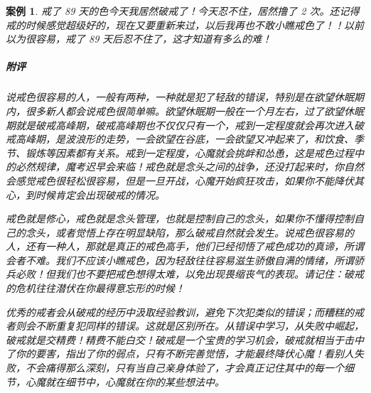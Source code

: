 \documentclass{ctexart}
\newtheorem{case}{案例}
\begin{document}
\begin{case}
    戒了 89 天的色今天我居然破戒了！今天忍不住，居然撸了 2 次。还记得戒的时候感觉超级好的，现在又要重新来过，以后我再也不敢小瞧戒色了！！以前以为很容易，戒了 89 天后忍不住了，这才知道有多么的难！
    \subparagraph{附评} 说戒色很容易的人，一般有两种，一种就是犯了轻敌的错误，特别是在欲望休眠期内，很多新人都会说戒色很简单嘛。欲望休眠期一般在一个月左右，过了欲望休眠期就是破戒高峰期，破戒高峰期也不仅仅只有一个，戒到一定程度就会再次进入破戒高峰期，是波浪形的走势，一会欲望在谷底，一会欲望又冲起来了，和饮食、季节、锻炼等因素都有关系。戒到一定程度，心魔就会挑衅和怂恿，这是戒色过程中的必然规律，魔考迟早会来临！戒色就是念头之间的战争，还没打起来时，你自然会感觉戒色很轻松很容易，但是一旦开战，心魔开始疯狂攻击，如果你不能降伏其心，到时候肯定会出现破戒的情况。

    戒色就是修心，戒色就是念头管理，也就是控制自己的念头，如果你不懂得控制自己的念头，或者觉悟上存在明显缺陷，那么破戒自然就会发生。说戒色很容易的人，还有一种人，那就是真正的戒色高手，他们已经彻悟了戒色成功的真谛，所谓会者不难。我们不应该小瞧戒色，因为轻敌往往容易滋生骄傲自满的情绪，所谓骄兵必败！但我们也不要把戒色想得太难，以免出现畏缩丧气的表现。请记住：破戒的危机往往潜伏在你最得意忘形的时候！

    优秀的戒者会从破戒的经历中汲取经验教训，避免下次犯类似的错误；而糟糕的戒者则会不断重复犯同样的错误。这就是区别所在。从错误中学习，从失败中崛起，破戒就是交精费！精费不能白交！破戒是一个宝贵的学习机会，破戒就相当于击中了你的要害，指出了你的弱点，只有不断完善觉悟，才能最终降伏心魔！看别人失败，不会痛得那么深刻，只有当自己亲身体验了，才会真正记住其中的每一个细节，心魔就在细节中，心魔就在你的某些想法中。
\end{case}
\end{document}
